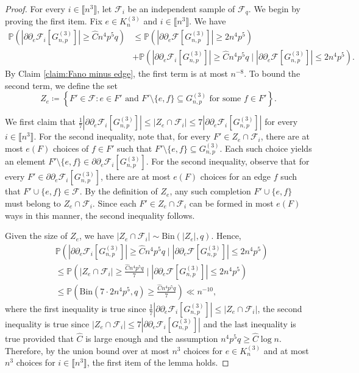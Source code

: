 \documentclass[11pt,a4paper,oneside,reqno]{amsart}
\newcommand{\Gnp}{G_{n, p}^{(3)}}
\newcommand{\cF}{\mathcal{F}}
\renewcommand{\Pr}{\mathbb{P}}
\newcommand{\1}{\mathbbm{1}} %
\newcommand{\br}[1]{\llbracket{#1}\rrbracket}
\renewcommand{\le}{\leqslant}
\renewcommand{\ge}{\geqslant}
\begin{document}
\begin{proof}
    For every $i \in \br{n^3}$, let $\cF_i$ be an independent sample of $\cF_q$.
    We begin by proving the first item. Fix $e \in K_n^{(3)}$ and $i \in \br{n^3}$. We have
    \begin{align*}
        \Pr\left(\left| \partial \partial_e\cF_i\left[\Gnp\right] \right| \ge \hat{C} n^4 p^5 q\right) &\le \Pr\left(\left| \partial \partial_e\cF\left[\Gnp\right] \right| \ge 2 n^4 p^5 \right) \\&+ \Pr\left(\left| \partial \partial_e \cF_i\left[\Gnp\right] \right| \ge \hat{C} n^4 p^5 q \mid \left|\partial \partial_e \cF\left[\Gnp\right] \right| \le 2 n^4 p^5 \right).
    \end{align*}
    By Claim \ref{claim:Fano minus edge}, the first term is at most $n^{-8}$. To bound the second term, we define the set
    \[
        Z_e \coloneqq \left\{F' \in \cF \colon e \in F' \text{ and } F' \setminus \{e, f\} \subseteq \Gnp \text{ for some } f \in F' \right\}.
    \]

    We first claim that $\frac{1}{7} \left|\partial \partial_e \cF_i\left[\Gnp\right] \right| \le |Z_e \cap \cF_i| \le 7 \left|\partial \partial_e \cF_i\left[\Gnp\right] \right|$ for every $i \in \br{n^3}$. 
    For the second inequality, note that, for every $F' \in Z_e \cap \cF_i$, there are at most $e(F)$ choices of $f \in F'$ such that $F' \setminus \{e, f\} \subseteq \Gnp$. Each such choice yields an element $F' \setminus \{e, f\} \in \partial \partial_e \cF_i[\Gnp]$.
    For the second inequality, observe that for every $F' \in \partial \partial_e \cF_i [\Gnp]$, there are at most $e(F)$ choices for an edge $f$ such that $F' \cup \{e, f\} \in \cF$. By the definition of $Z_e$, any such completion $F' \cup \{e,f\}$ must belong to $Z_e \cap \cF_i$. Since each $F' \in Z_e \cap \cF_i$ can be formed in most $e(F)$ ways in this manner, the second inequality follows.

    Given the size of $Z_e$, we have $|Z_e \cap \cF_i| \sim \text{Bin}(|Z_e|, q)$. Hence,
    \begin{align*}
        &\Pr\left(\left| \partial \partial_e \cF_i\left[\Gnp\right] \right| \ge \hat{C} n^4 p^5 q \mid \left|\partial \partial_e \cF\left[\Gnp\right] \right| \le 2 n^4 p^5 \right) \\&\le \Pr\left(\left| Z_e \cap \cF_i \right| \ge \frac{\hat{C} n^4 p^5 q}{7}  \mid \left|\partial \partial_e \cF\left[\Gnp\right] \right| \le 2 n^4 p^5 \right)
        \\&\le \Pr\left(\text{Bin}(7 \cdot 2 n^4 p^5, q) \ge \frac{\hat{C} n^4 p^5 q}{7}\right) \ll n^{-10},
    \end{align*}
    where the first inequality is true since $\frac{1}{7} \left|\partial \partial_e \cF_i\left[\Gnp\right] \right| \le |Z_e \cap \cF_i|$, the second inequality is true since $|Z_e \cap \cF_i| \le 7 \left|\partial \partial_e \cF_i\left[\Gnp\right] \right|$ and the last inequality is true provided that $\hat{C}$ is large enough and the assumption $n^4 p^5 q \ge \hat{C} \log n$. Therefore, by the union bound over at most $n^3$ choices for $e \in K_n^{(3)}$ and at most $n^3$ choices for $i \in \br{n^3}$, the first item of the lemma holds.
    

\end{proof}
\end{document}
